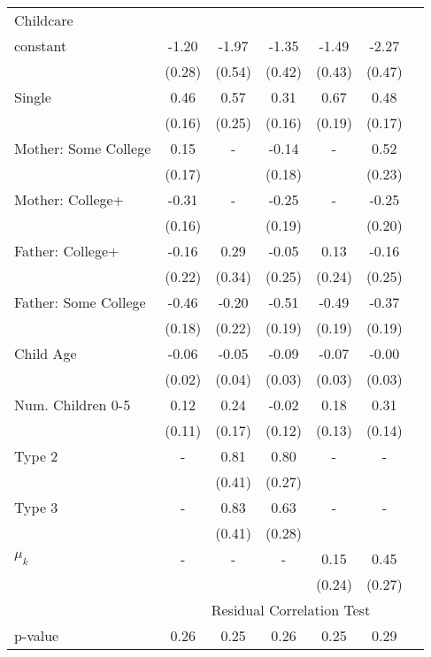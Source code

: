\begin{tabular}{lcccccc}
Childcare}\\\cmidrule(r){2-7}constant&-1.20&-1.97&-1.35&-1.49&-2.27&\\&(0.28)&(0.54)&(0.42)&(0.43)&(0.47)&\\Single&0.46&0.57&0.31&0.67&0.48&\\&(0.16)&(0.25)&(0.16)&(0.19)&(0.17)&\\Mother: Some College&0.15&-&-0.14&-&0.52&\\&(0.17)&&(0.18)&&(0.23)&\\Mother: College+&-0.31&-&-0.25&-&-0.25&\\&(0.16)&&(0.19)&&(0.20)&\\Father: College+&-0.16&0.29&-0.05&0.13&-0.16&\\&(0.22)&(0.34)&(0.25)&(0.24)&(0.25)&\\Father: Some College&-0.46&-0.20&-0.51&-0.49&-0.37&\\&(0.18)&(0.22)&(0.19)&(0.19)&(0.19)&\\Child Age&-0.06&-0.05&-0.09&-0.07&-0.00&\\&(0.02)&(0.04)&(0.03)&(0.03)&(0.03)&\\Num. Children 0-5&0.12&0.24&-0.02&0.18&0.31&\\&(0.11)&(0.17)&(0.12)&(0.13)&(0.14)&\\Type 2&-&0.81&0.80&-&-&\\&&(0.41)&(0.27)&&&\\Type 3&-&0.83&0.63&-&-&\\&&(0.41)&(0.28)&&&\\$\mu_{k}$&-&-&-&0.15&0.45&\\&&&&(0.24)&(0.27)&\\& \multicolumn{6}{c}{Residual Correlation Test}\\\cmidrule(r){2-7}p-value&0.26&0.25&0.26&0.25&0.29&\\
\bottomrule\end{tabular}